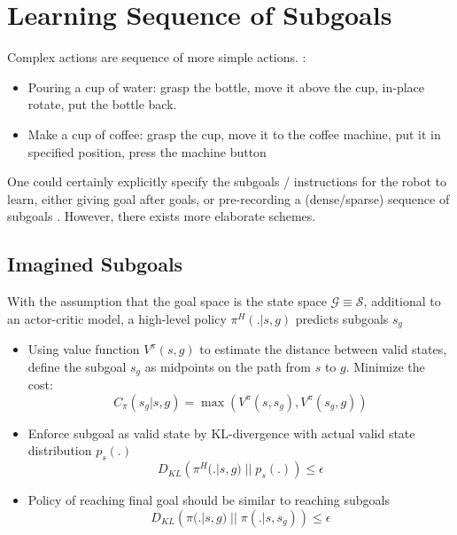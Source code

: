 \section{Learning Sequence of Subgoals}
Complex actions are sequence of more simple actions. \Eg:
\begin{itemize}
	\item Pouring a cup of water: grasp the bottle, move it above the cup, in-place rotate, put the bottle back.
	\item Make a cup of coffee: grasp the cup, move it to the coffee machine, put it in specified position, press the machine button \cite{smith2019avid}
\end{itemize}
One could certainly explicitly specify the subgoals / instructions for the robot to learn, either giving goal after goals, or pre-recording a (dense/sparse) sequence of subgoals \cite{pathak2018zero, smith2019avid}. However, there exists more elaborate schemes.

\subsection{Imagined Subgoals}
With the assumption that the goal space is the state space $ \mathcal{G} \equiv \mathcal{S} $, additional to an actor-critic model, a high-level policy $ \pi^{H}(.|s,g) $ predicts subgoals $ s_g $ \cite{chane2021goal}
\begin{itemize}
	\item Using value function $ V^{\pi}(s, g) $ to estimate the distance between valid states, define the subgoal $ s_g $ as midpoints on the path from $s$ to $g$. Minimize the cost:
	\begin{equation}
		C_{\pi}(s_g |s, g) = \max \left( V^{\pi}(s, s_g), V^{\pi}(s_g, g) \right)
	\end{equation}
	\item Enforce subgoal as valid state by \ac{KL}-divergence with actual valid state distribution $ p_s(.) $
	\begin{equation}
		D_{KL}\left( \pi^{H}(.|s, g) \;||\; p_s(.) \right) \leq \epsilon
	\end{equation}
	\item Policy of reaching final goal should be similar to reaching subgoals
	\begin{equation}
		D_{KL}\left( \pi(.|s, g) \;||\; \pi(.|s, s_g) \right) \leq \epsilon
	\end{equation}
\end{itemize}

